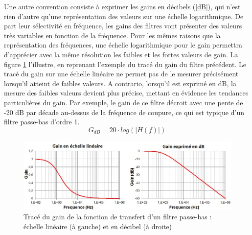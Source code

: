 	Une autre convention consiste à exprimer les gains en décibels (\ref{dB}), qui n'est rien d'autre qu'une représentation des valeurs sur une échelle logarithmique. De part leur sélectivité en fréquence, les gains des filtres vont présenter des valeurs très variables en fonction de la fréquence. Pour les mêmes raisons que la représentation des fréquences, une échelle logarithmique pour le gain permettra d'apprécier avec la même résolution les faibles et les fortes valeurs de gain. La figure \ref{Fig:Effet_Ylin_dB} l'illustre, en reprenant l'exemple du tracé du gain du filtre précédent. Le tracé du gain sur une échelle linéaire ne permet pas de le mesurer précisément lorsqu'il atteint de faibles valeurs. A contrario, lorsqu'il est exprimé en dB, la mesure des faibles valeurs devient plus précise, mettant en évidence les tendances particulières du gain. Par exemple, le gain de ce filtre décroit avec une pente de -20 dB par décade au-dessus de la fréquence de coupure, ce qui est typique d'un filtre passe-bas d'ordre 1. 
	\begin{equation}\label{dB}
	G_{dB} = 20 \cdot log(|H(f)|)
	\end{equation}
	
	\begin{figure}[h!]
		\centering
		\includegraphics[scale=0.6]{images/Effet_Ylin_dB.jpg}
		\caption{Tracé du gain de la fonction de transfert d'un filtre passe-bas : échelle linéaire (à gauche) et en décibel (à droite)}	
		\label{Fig:Effet_Ylin_dB} 
	\end{figure}
	
